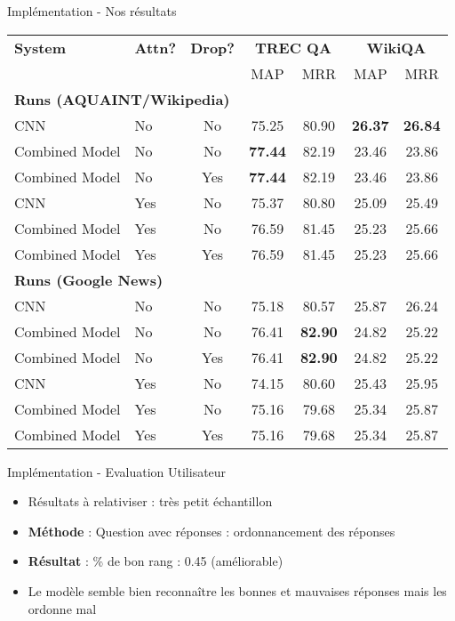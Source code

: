 \documentclass{beamer}
\begin{document}
\begin{frame}{Implémentation - Nos résultats}
 \scriptsize
  \centering
  \begin{tabular}{llc|cc|cc}
    \toprule
    \textbf{System} & \textbf{Attn?} & \textbf{Drop?} & \multicolumn{2}{c|}{\textbf{TREC QA}} & \multicolumn{2}{c}{\textbf{WikiQA}} \\
    & & & MAP & MRR & MAP & MRR \\
    \midrule
    \multicolumn{7}{l}{\textbf{Runs (AQUAINT/Wikipedia)}} \\
    CNN & No & No & 75.25 & 80.90 & \textbf{26.37} & \textbf{26.84}\\
    Combined Model & No & No & \textbf{77.44} & 82.19 & 23.46 & 23.86\\
    Combined Model & No & Yes & \textbf{77.44} & 82.19 & 23.46 & 23.86\\
    CNN & Yes & No & 75.37 & 80.80 & 25.09 & 25.49\\
    Combined Model & Yes & No & 76.59 & 81.45 & 25.23 & 25.66\\
    Combined Model & Yes & Yes & 76.59 & 81.45 & 25.23 & 25.66\\
    \midrule
    \multicolumn{7}{l}{\textbf{Runs (Google News)}} \\
    CNN & No & No & 75.18 & 80.57 & 25.87 & 26.24\\
    Combined Model & No & No & 76.41 & \textbf{82.90} & 24.82 & 25.22\\
    Combined Model & No & Yes & 76.41 & \textbf{82.90} & 24.82 & 25.22\\
    CNN & Yes & No & 74.15 & 80.60 & 25.43 & 25.95\\
    Combined Model & Yes & No & 75.16 & 79.68 & 25.34 & 25.87\\
    Combined Model & Yes & Yes & 75.16 & 79.68 & 25.34 & 25.87\\
    \bottomrule
  \end{tabular}
\end{frame}

\begin{frame}{Implémentation - Evaluation Utilisateur}
  \begin{itemize}
    \item Résultats à relativiser : très petit échantillon
    \item \textbf{Méthode} : Question avec réponses : ordonnancement des réponses
    \item \textbf{Résultat} : \% de bon rang : 0.45 (améliorable)
    \item Le modèle semble bien reconnaître les bonnes et mauvaises réponses mais les ordonne mal
  \end{itemize}
\end{frame}
\end{document}
